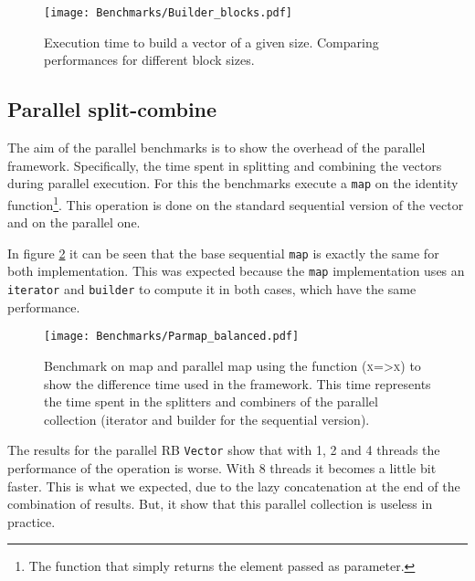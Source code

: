 \begin{figure}[h!]
  \centering
  \texttt{[image: Benchmarks/Builder\_blocks.pdf]}
  \caption{Execution time to build a vector of a given size. Comparing performances for different block sizes.}
  \label{BuilderBlocksBenchmarks}
\end{figure}

\FloatBarrier

\subsection{Parallel split-combine}
The aim of the parallel benchmarks is to show the overhead of the parallel framework. Specifically, the time spent in splitting and combining the vectors during parallel execution. For this the benchmarks execute a \texttt{map} on the identity function\footnote{The function that simply returns the element passed as parameter.}. This operation is done on the standard sequential version of the vector and on the parallel one.

In figure \ref{ParallelBenchmarks} it can be seen that the base sequential \texttt{map} is exactly the same for both implementation. This was expected because the \texttt{map} implementation uses an \texttt{iterator} and \texttt{builder} to compute it in both cases, which have the same performance. 

\begin{figure}[h!]
  \centering
  \texttt{[image: Benchmarks/Parmap\_balanced.pdf]}
  \caption{Benchmark on map and parallel map using the function (\textsc{x=>x}) to show the difference time used in the framework. This time represents the time spent in the splitters and combiners of the parallel collection (iterator and builder for the sequential version).}
  \label{ParallelBenchmarks}
\end{figure}

The results for the parallel RB \texttt{Vector} show that with 1, 2 and 4 threads the performance of the operation is worse. With 8 threads it becomes a little bit faster. This is what we expected, due to the lazy concatenation at the end of the combination of results. But, it show that this parallel collection is useless in practice.

